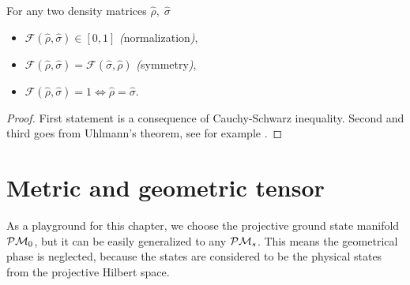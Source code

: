 \begin{thm}
    For any two density matrices $\hat\rho,\;\hat\sigma$
    \begin{itemize}
        \item $\mathcal F(\hat\rho,\hat\sigma)\in[0,1]$ \emph(normalization\emph),
        \item $\mathcal F(\hat\rho,\hat\sigma) = \mathcal F(\hat\sigma,\hat\rho)$ \emph(symmetry\emph),
        \item $\mathcal F(\hat\rho,\hat\sigma)=1 \Leftrightarrow \hat\rho=\hat\sigma$.
    \end{itemize}
\end{thm}
\begin{proof}
    First statement is a consequence of Cauchy-Schwarz inequality. Second and third goes from Uhlmann's theorem, see for example \cite{uhlman}.
\end{proof}



\section{Metric and geometric tensor}
\label{chap:metricTensor}
As a playground for this chapter, we choose the projective ground state manifold $\mathcal{P}\mathcal{M}_0$, but it can be easily generalized to any $\mathcal{P}\mathcal{M}_s$. This means the geometrical phase is neglected, because the states are considered to be the physical states from the projective Hilbert space.


